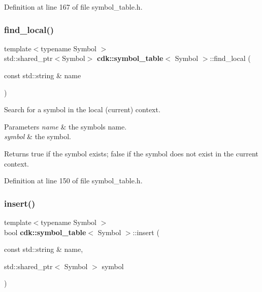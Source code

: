 Definition at line 167 of file symbol\+\_\+table.\+h.

\mbox{\label{classcdk_1_1symbol__table_a7b5a83e2dfef11c7c3ffef952267b012}} 
\subsubsection{find\+\_\+local()}
{\footnotesize\ttfamily template$<$typename Symbol $>$ \\
std\+::shared\+\_\+ptr$<$Symbol$>$ \textbf{ cdk\+::symbol\+\_\+table}$<$ Symbol $>$\+::find\+\_\+local (\begin{DoxyParamCaption}\item[{const std\+::string \&}]{name }\end{DoxyParamCaption})\hspace{0.3cm}{\ttfamily [inline]}}

Search for a symbol in the local (current) context.


\begin{DoxyParams}{Parameters}
{\em name} & the symbol\textquotesingle{}s name. \\
\hline
{\em symbol} & the symbol. \\
\hline
\end{DoxyParams}
\begin{DoxyReturn}{Returns}
{\ttfamily true} if the symbol exists; {\ttfamily false} if the symbol does not exist in the current context. 
\end{DoxyReturn}


Definition at line 150 of file symbol\+\_\+table.\+h.

\mbox{\label{classcdk_1_1symbol__table_ab0d7ace7cea6530192dc426b0d02dca5}} 
\subsubsection{insert()}
{\footnotesize\ttfamily template$<$typename Symbol $>$ \\
bool \textbf{ cdk\+::symbol\+\_\+table}$<$ Symbol $>$\+::insert (\begin{DoxyParamCaption}\item[{const std\+::string \&}]{name,  }\item[{std\+::shared\+\_\+ptr$<$ Symbol $>$}]{symbol }\end{DoxyParamCaption})\hspace{0.3cm}{\ttfamily [inline]}}

